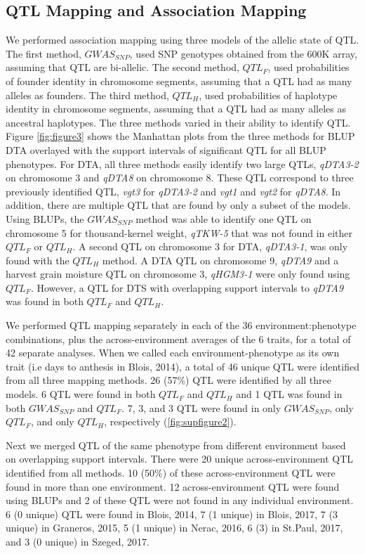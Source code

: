 \documentclass[article,9pt,twocolumn,twoside]{rilabRxiv}
\begin{document}
\subsection{QTL Mapping and Association Mapping}
We performed association mapping using three models of the allelic state of QTL.
The first method, $GWAS_{SNP}$, used SNP genotypes obtained from the 600K array, assuming that QTL are bi-allelic.
The second method, $QTL_F$, used probabilities of founder identity in chromosome segments, assuming that a QTL had as many alleles as founders.
The third method, $QTL_H$, used probabilities of haplotype identity in chromosome segments, assuming that a QTL had as many alleles as ancestral haplotypes.
The three methods varied in their ability to identify QTL.
Figure \ref{fig:figure3} shows the Manhattan plots from the three methods for BLUP DTA overlayed with the support intervals of significant QTL for all BLUP phenotypes.
For DTA, all three methods easily identify two large QTLs, \emph{qDTA3-2} on chromosome 3 and \emph{qDTA8} on chromosome 8. These QTL correspond to three previously identified QTL, \emph{vgt3} for \emph{qDTA3-2} and \emph{vgt1} and \emph{vgt2} for \emph{qDTA8}.
In addition, there are multiple QTL that are found by only a subset of the models.
Using BLUPs, the $GWAS_{SNP}$ method was able to identify one QTL on chromosome 5 for thousand-kernel weight, \emph{qTKW-5} that was not found in either $QTL_F$ or $QTL_H$.
A second QTL on chromosome 3 for DTA, \emph{qDTA3-1}, was only found with the $QTL_H$ method.
A DTA QTL on chromosome 9, \emph{qDTA9} and a harvest grain moisture QTL on chromosome 3, \emph{qHGM3-1} were only found using $QTL_F$.
However, a QTL for DTS with overlapping support intervals to \emph{qDTA9} was found in both $QTL_F$ and $QTL_H$.

We performed QTL mapping separately in each of the 36 environment:phenotype combinations, plus the across-environment averages of the 6 traits, for a total of 42 separate analyses.
When we called each environment-phenotype as its own trait (i.e days to anthesis in Blois, 2014), a total of 46 unique QTL were identified from all three mapping methods.
26 (57\%) QTL were identified by all three models.
6 QTL were found in both $QTL_F$ and $QTL_H$ and 1 QTL was found in both $GWAS_{SNP}$ and $QTL_F$.
7, 3, and 3 QTL were found in only $GWAS_{SNP}$, only $QTL_F$, and only $QTL_H$, respectively (\ref{fig:supfigure2}).

Next we merged QTL of the same phenotype from different environment based on overlapping support intervals.
There were 20 unique across-environment QTL identified from all methods.
10 (50\%) of these across-environment QTL were found in more than one environment.
12 across-environment QTL were found using BLUPs and 2 of these QTL were not found in any individual environment.
6 (0 unique) QTL were found in Blois, 2014, 7 (1 unique) in Blois, 2017, 7 (3 unique) in Graneros, 2015, 5 (1 unique) in Nerac, 2016, 6 (3) in St.Paul, 2017, and 3 (0 unique) in Szeged, 2017.
\end{document}

